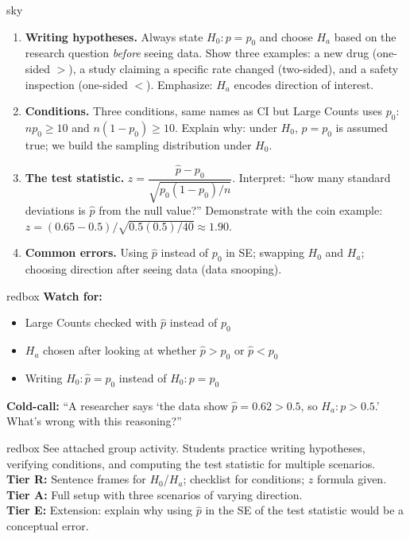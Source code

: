 \documentclass[10pt]{article}
\begin{document}
\begin{skillbox}[Lesson]{sky}
    \begin{enumerate}[leftmargin=1.4em, label=\arabic*.]
        \item \textbf{Writing hypotheses.} Always state $H_0: p = p_0$ and choose $H_a$ based
              on the research question \emph{before} seeing data. Show three examples: a new
              drug (one-sided $>$), a study claiming a specific rate changed (two-sided), and
              a safety inspection (one-sided $<$). Emphasize: $H_a$ encodes direction of interest.

        \item \textbf{Conditions.} Three conditions, same names as CI but Large Counts uses $p_0$:
              $np_0 \ge 10$ and $n(1-p_0) \ge 10$. Explain why: under $H_0$, $p = p_0$ is
              assumed true; we build the sampling distribution under $H_0$.

        \item \textbf{The test statistic.}
              $z = \dfrac{\hat p - p_0}{\sqrt{p_0(1-p_0)/n}}$.
              Interpret: ``how many standard deviations is $\hat p$ from the null value?''
              Demonstrate with the coin example: $z = (0.65 - 0.5)/\sqrt{0.5(0.5)/40} \approx 1.90$.

        \item \textbf{Common errors.} Using $\hat p$ instead of $p_0$ in SE; swapping $H_0$ and
              $H_a$; choosing direction after seeing data (data snooping).
    \end{enumerate}
\end{skillbox}

\begin{skillbox}{redbox}
    \textbf{Watch for:}
    \begin{itemize}[leftmargin=1.2em]
        \item Large Counts checked with $\hat p$ instead of $p_0$
        \item $H_a$ chosen after looking at whether $\hat p > p_0$ or $\hat p < p_0$
        \item Writing $H_0: \hat p = p_0$ instead of $H_0: p = p_0$
    \end{itemize}
    \textbf{Cold-call:} ``A researcher says `the data show $\hat p = 0.62 > 0.5$, so $H_a: p > 0.5$.'
    What's wrong with this reasoning?''
\end{skillbox}

\begin{skillbox}{redbox}
    See attached group activity. Students practice writing hypotheses, verifying conditions,
    and computing the test statistic for multiple scenarios.\\[4pt]
    \textbf{Tier R:} Sentence frames for $H_0$/$H_a$; checklist for conditions; $z$ formula given.\\
    \textbf{Tier A:} Full setup with three scenarios of varying direction.\\
    \textbf{Tier E:} Extension: explain why using $\hat p$ in the SE of the test statistic
    would be a conceptual error.
\end{skillbox}
\end{document}
